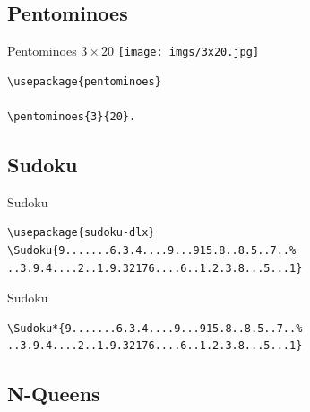 \documentclass{beamer}
\begin{document}
\subsection{Pentominoes}

%

%
\begin{frame}[fragile]{Pentominoes $3\times20$}
\centering\texttt{[image: imgs/3x20.jpg]}
\begin{verbatim}
\usepackage{pentominoes}

\pentominoes{3}{20}.
\end{verbatim}  
\end{frame}

\subsection{Sudoku}

%
\begin{frame}[fragile]{Sudoku}
\begin{verbatim}
\usepackage{sudoku-dlx}
\Sudoku{9.......6.3.4....9...915.8..8.5..7..%
..3.9.4....2..1.9.32176....6..1.2.3.8...5...1}
\end{verbatim}  

\begin{center}
\end{center}
\end{frame}

%
\begin{frame}[fragile]{Sudoku}
\begin{verbatim}
\Sudoku*{9.......6.3.4....9...915.8..8.5..7..%
..3.9.4....2..1.9.32176....6..1.2.3.8...5...1}
\end{verbatim}

\begin{center}
\end{center}
\end{frame}

\subsection{N-Queens}
\end{document}
